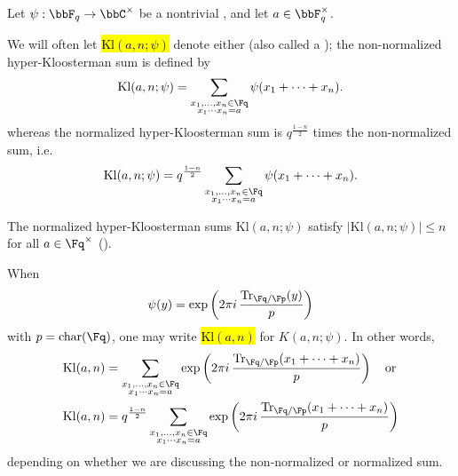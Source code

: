 \begin{definition} \label{definition:hyper_kloosterman_sum}
    Let $\psi: \bbF_q \to \bbC^\times$ be a nontrivial , and let $a \in \bbF_q^\times$.
    
    We will often let \hl{$\mathrm{Kl}(a,n;\psi)$} denote either  (also called a ); the non-normalized hyper-Kloosterman sum is defined by 
    $$\mathrm{Kl}(a,n;\psi) = \sum_{\substack{x_1,\ldots,x_n \in \Fq \\ x_1\cdots x_n = a}} \psi(x_1 + \cdots + x_n).$$
    whereas the normalized hyper-Kloosterman sum is $q^{\frac{1-n}{2}}$ times the non-normalized sum, i.e.
    $$\mathrm{Kl}(a,n;\psi) = q^{\frac{1-n}{2}} \sum_{\substack{x_1,\ldots,x_n \in \Fq \\ x_1\cdots x_n = a}} \psi(x_1 + \cdots + x_n).$$

    The normalized hyper-Kloosterman sums $\mathrm{Kl}(a,n;\psi)$ satisfy $|\mathrm{Kl}(a,n;\psi)| \leq n$ for all $a \in \Fq^\times$ ().

    When 
    $$\psi(y) = \exp\left( 2\pi i\, \frac{\mathrm{Tr}_{\Fq/\Fp}(y)}{p} \right)$$
    with $p = \mathrm{char}(\Fq)$, one may write \hl{$\mathrm{Kl}(a,n)$} for $K(a,n;\psi)$. In other words,
    \begin{align*}
    \mathrm{Kl}(a,n) &= \sum_{\substack{x_1,\ldots,x_n \in \Fq \\ x_1\cdots x_n = a}} \exp\left( 2\pi i\, \frac{\mathrm{Tr}_{\Fq/\Fp}(x_1 + \cdots + x_n)}{p} \right) \quad \text{or} \\
    \mathrm{Kl}(a,n) &= q^{\frac{1-n}{2}}\sum_{\substack{x_1,\ldots,x_n \in \Fq \\ x_1\cdots x_n = a}} \exp\left( 2\pi i\, \frac{\mathrm{Tr}_{\Fq/\Fp}(x_1 + \cdots + x_n)}{p} \right)
    \end{align*}
    depending on whether we are discussing the non-normalized or normalized sum.
\end{definition}


